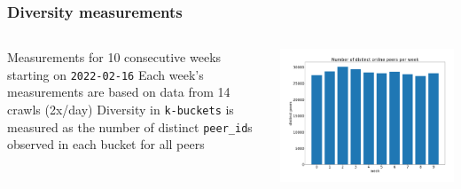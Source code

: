\documentclass{pl-slide}
\begin{document}
\fi

\begin{frame}
\frametitle{Diversity measurements}
\begin{columns}[onlytextwidth]
\begin{column}{0.38\textwidth}
   \begin{itemize}
   		\itemc Measurements for 10 consecutive weeks starting on \texttt{2022-02-16}
   		\itemc Each week's measurements are based on data from 14 crawls (2x/day)
   		\itemc Diversity in \texttt{k-buckets} is measured as the number of distinct \texttt{peer\_id}s observed in each bucket for all peers
   \end{itemize}
\end{column}
\begin{column}{0.58\textwidth}
    \begin{center}
		\includegraphics[width=\textwidth]{plots/online-peers-per-week.png}
    \end{center}
\end{column}
\end{columns}
\end{frame}
\end{document}
